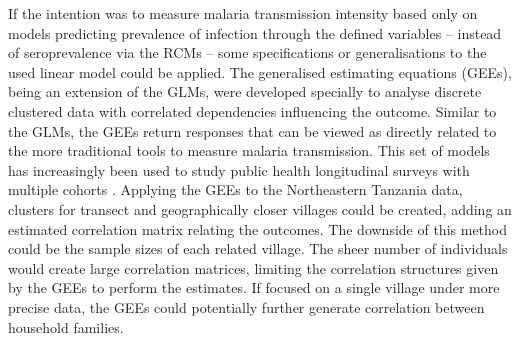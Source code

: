 If the intention was to measure malaria transmission intensity based only on models predicting prevalence of infection through the defined variables -- instead of seroprevalence via the RCMs -- some specifications or generalisations to the used linear model could be applied.
The generalised estimating equations (GEEs), being an extension of the GLMs, were developed specially to analyse discrete clustered data with correlated dependencies influencing the outcome.
Similar to the GLMs, the GEEs return responses that can be viewed as directly related to the more traditional tools to measure malaria transmission.
This set of models has increasingly been used to study public health longitudinal surveys with multiple cohorts \cite{hanley2003statistical,hubbard2010gee}.
Applying the GEEs to the Northeastern Tanzania data, clusters for transect and geographically closer villages could be created, adding an estimated correlation matrix relating the outcomes.
The downside of this method could be the sample sizes of each related village.
The sheer number of individuals would create large correlation matrices, limiting the correlation structures given by the GEEs to perform the estimates.
If focused on a single village under more precise data, the GEEs could potentially further generate correlation between household families.

